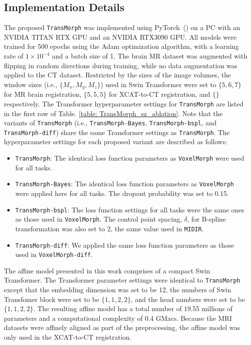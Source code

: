 \documentclass[times,twocolumn,final]{elsarticle}
\begin{document}
\subsection{Implementation Details}
The proposed \texttt{TransMorph} was implemented using PyTorch~(\cite{paszke2019pytorch}) on a PC with an NVIDIA TITAN RTX GPU and an NVIDIA RTX3090 GPU. All models were trained for 500 epochs using the Adam optimization algorithm, with a learning rate of $1\times 10^{-4}$ and a batch size of 1. The brain MR dataset was augmented with flipping in random directions during training, while no data augmentation was applied to the CT dataset. Restricted by the sizes of the image volumes, the window sizes (i.e., $\{M_x, M_y, M_z\}$) used in Swin Transformer were set to $\{5, 6, 7\}$ for MR brain registration, $\{5, 5, 5\}$ for XCAT-to-CT registration, and $\{\}$respectively. The Transformer hyperparameter settings for \texttt{TransMorph} are listed in the first row of Table. \ref{table: TransMorph_sz_ablation}. Note that the variants of \texttt{TransMorph} (i.e., \texttt{TransMorph-Bayes}, \texttt{TransMorph-bspl}, and \texttt{TransMorph-diff}) share the same Transformer settings as \texttt{TransMorph}. The hyperparameter settings for each proposed variant are described as follows:
\begin{itemize}[noitemsep]
    \item \texttt{TransMorph}: The identical loss function parameters as \texttt{VoxelMorph} were used for all tasks.
    \item \texttt{TransMorph-Bayes}: The identical loss function parameters as \texttt{VoxelMorph} were applied here for all tasks. The dropout probability was set to 0.15.
    \item \texttt{TransMorph-bspl}: The loss function settings for all tasks were the same ones as those used in \texttt{VoxelMorph}. The control point spacing, $\delta$, for B-spline transformation was also set to 2, the same value used in \texttt{MIDIR}.
    \item \texttt{TransMorph-diff}: We applied the same loss function parameters as those used in \texttt{VoxelMorph-diff}.
\end{itemize}

The affine model presented in this work comprises of a compact Swin Transformer. The Transformer parameter settings were identical to \texttt{TransMorph} except that the embedding dimension was set to be 12, the numbers of Swin Transfomer block were set to be $\{1,1,2,2\}$, and the head numbers were set to be $\{1,1,2,2\}$. The resulting affine model has a total number of 19.55 millions of parameters and a computational complexity of 0.4 GMacs. Because the MRI datasets were affinely aligned as part of the preprocessing, the affine model was only used in the XCAT-to-CT registration.
\end{document}
